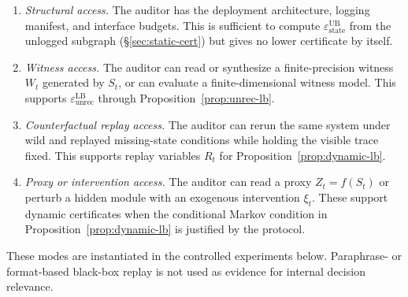   \begin{enumerate}
    \item \emph{Structural access.} The auditor has the deployment architecture,
   logging manifest, and interface budgets. This is sufficient to compute
  $\varepsilon_\text{state}^\text{UB}$ from the unlogged subgraph
  (\S\ref{sec:static-cert}) but gives no lower certificate by itself.

    \item \emph{Witness access.} The auditor can read or synthesize a
  finite-precision witness $W_t$ generated by $S_t$, or can evaluate a
  finite-dimensional witness model. This supports
  $\varepsilon_\text{unrec}^\text{LB}$ through
  Proposition~\ref{prop:unrec-lb}.

    \item \emph{Counterfactual replay access.} The auditor can rerun the same
  system under wild and replayed missing-state conditions while holding the
  visible trace fixed. This supports replay variables $R_t$ for
  Proposition~\ref{prop:dynamic-lb}.

    \item \emph{Proxy or intervention access.} The auditor can read a proxy
  $Z_t=f(S_t)$ or perturb a hidden module with an exogenous intervention
  $\xi_t$. These support dynamic certificates when the conditional Markov
  condition in Proposition~\ref{prop:dynamic-lb} is justified by the protocol.
  \end{enumerate}

  These modes are instantiated in the controlled experiments below.
  Paraphrase- or format-based black-box replay is not used as evidence for
  internal decision relevance.

